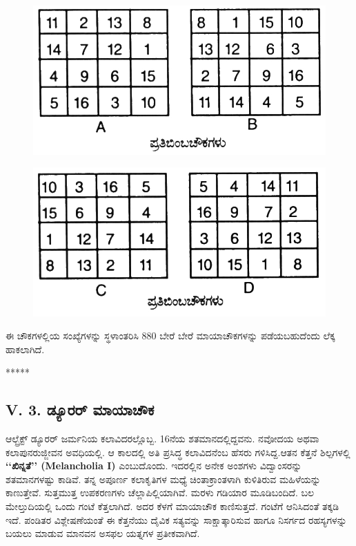 \begin{figure}[h]
\includegraphics{src/figures/chap4/fig4.13.jpg}
\end{figure}
\begin{figure}[h]
\includegraphics{src/figures/chap4/fig4.14.jpg}
\end{figure}

ಈ ಚೌಕಗಳಲ್ಲಿಯ ಸಂಖ್ಯೆಗಳನ್ನು ಸ್ಥಳಾಂತರಿಸಿ 880 ಬೇರೆ ಬೇರೆ ಮಾಯಾಚೌಕಗಳನ್ನು ಪಡೆಯಬಹುದೆಂದು ಲೆಕ್ಕ ಹಾಕಲಾಗಿದೆ.
\begin{center}
*****
\end{center}

\subsection*{V. 3. ಡ್ಯೂರರ್ ಮಾಯಾಚೌಕ}

ಆಲ್ಬ್ರೆಕ್ಟ್ ಡ್ಯೂರರ್ ಜರ್ಮನಿಯ ಕಲಾವಿದರಲ್ಲೊಬ್ಬ. 16ನೆಯ ಶತಮಾನದಲ್ಲಿದ್ದವನು. ನವೋದಯ ಅಥವಾ ಕಲಾಪುನರುಜ್ಜೀವನ ಅವಧಿಯಲ್ಲಿ. ಆ ಕಾಲದಲ್ಲಿ ಅತಿ ಪ್ರಸಿದ್ಧ ಕಲಾವಿದನೆಂಬ ಹೆಸರು ಗಳಿಸಿದ್ದ.ಆತನ ಕೆತ್ತನೆ ಶಿಲ್ಪಗಳಲ್ಲಿ \textbf{‘‘ಖಿನ್ನತೆ’’ (Melancholia I)} ಎಂಬುದೊಂದು. ಇದರಲ್ಲಿನ ಅನೇಕ ಅಂಶಗಳು ವಿದ್ವಾಂಸರನ್ನು ಶತಮಾನಗಳಷ್ಟು ಕಾಡಿವೆ. ತನ್ನ ಅಪೂರ್ಣ ಕಲಾಕೃತಿಗಳ ಮಧ್ಯೆ ಚಿಂತಾಕ್ರಾಂತಳಾಗಿ ಕುಳಿತಿರುವ ಮಹಿಳೆಯನ್ನು ಕಾಣುತ್ತೇವೆ. ಸುತ್ತಮುತ್ತ ಉಪಕರಣಗಳು ಚೆಲ್ಲಾಪಿಲ್ಲಿಯಾಗಿವೆ. ಮರಳು ಗಡಿಯಾರ ಮೂಡಿಬಂದಿದೆ. ಬಲ ಮೇಲ್ತುದಿಯಲ್ಲಿ ಒಂದು ಗಂಟೆ ಕೆತ್ತಲಾಗಿದೆ. ಅದರ ಕೆಳಗೆ ಮಾಯಾಚೌಕ ಕಾಣಿಸುತ್ತದೆ. ಗಂಟೆಗೆ ಆನಿಸಿದಂತೆ ತಕ್ಕಡಿ ಇದೆ. ಪಂಡಿತರ ವಿಶ್ಲೇಷಣೆಯಂತೆ ಈ ಕೆತ್ತನೆಯು ದೈವಿಕ ಸತ್ಯವನ್ನು ಸಾಕ್ಷಾತ್ಕಾರಿಸುವ ಹಾಗೂ ನಿಸರ್ಗದ ರಹಸ್ಯಗಳನ್ನು ಬಯಲು ಮಾಡುವ ಮಾನವನ ಅಸಫಲ ಯತ್ನಗಳ ಪ್ರತೀಕವಾಗಿದೆ.

